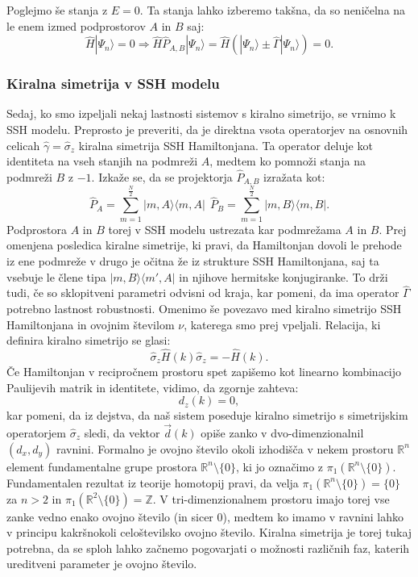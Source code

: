 Poglejmo še stanja z $E = 0$. Ta stanja lahko izberemo takšna, da so neničelna na le enem izmed podprostorov $A$ in $B$ saj:
\begin{equation}
\hat{H} | \Psi_n \rangle = 0  \Rightarrow  \hat{H} \hat{P}_{A,B} |\Psi_n \rangle = \hat{H} ( | \Psi_n \rangle \pm \hat{\Gamma} | \Psi_n \rangle ) = 0.
\end{equation}

\subsubsection{Kiralna simetrija v SSH modelu}
Sedaj, ko smo izpeljali nekaj lastnosti sistemov s kiralno simetrijo, se vrnimo k SSH modelu.
Preprosto je preveriti, da je direktna vsota operatorjev na osnovnih celicah $\hat{\gamma} = \hat{\sigma}_z$ kiralna simetrija SSH Hamiltonjana. Ta operator deluje kot identiteta na vseh stanjih na podmreži $A$, medtem ko pomnoži stanja na podmreži $B$ z $-1$.
Izkaže se, da se projektorja $\hat{P}_{A,B}$ izražata kot:
\begin{equation}
\hat{P}_A = \sum_{m=1}^{\frac{N}{2}}  | m, A \rangle \langle m, A | \ \ \hat{P}_B = \sum_{m=1}^{\frac{N}{2}}  | m, B \rangle \langle m, B |.
\end{equation}
Podprostora $A$ in $B$ torej v SSH modelu ustrezata kar podmrežama $A$ in $B$.
Prej omenjena posledica kiralne simetrije, ki pravi, da Hamiltonjan dovoli le prehode iz ene podmreže v drugo je očitna že iz strukture SSH Hamiltonjana, saj ta vsebuje le člene tipa $ |m, B \rangle \langle m' , A | $ in njihove hermitske konjugiranke. To drži tudi, če so sklopitveni parametri odvisni od kraja, kar pomeni, da ima operator $\hat{\Gamma}$ potrebno lastnost robustnosti.
Omenimo še povezavo med kiralno simetrijo SSH Hamiltonjana in ovojnim številom $\nu$, katerega smo prej vpeljali.
Relacija, ki definira kiralno simetrijo se glasi: 
\begin{equation}
\hat{\sigma}_z \hat{H}(k) \hat{\sigma}_z = - \hat{H}(k).
\end{equation}
Če Hamiltonjan v recipročnem prostoru spet zapišemo kot linearno kombinacijo Paulijevih matrik in identitete, vidimo, da zgornje zahteva:
\begin{equation}
d_z (k) = 0,
\end{equation}
kar pomeni, da iz dejstva, da naš sistem poseduje kiralno simetrijo s simetrijskim operatorjem $\hat{\sigma}_z$ sledi, da vektor $\vec{d}(k)$ opiše zanko v dvo-dimenzionalnil $(d_x,d_y)$ ravnini. Formalno je ovojno število okoli izhodišča v nekem prostoru $\mathbb{R}^n$ element fundamentalne grupe prostora $\mathbb{R}^n \setminus \{0\}$, ki jo označimo z $\pi_1 ( \mathbb{R}^n \setminus \{0 \})$. Fundamentalen rezultat iz teorije homotopij \cite{hatcher} pravi, da velja  $\pi_1 ( \mathbb{R}^n \setminus \{0 \}) = \{ 0 \}$ za $n>2$  in  $\pi_1 ( \mathbb{R}^2 \setminus \{0 \}) = \mathbb{Z}$.
V tri-dimenzionalnem prostoru imajo torej vse zanke vedno enako ovojno število (in sicer $0$), medtem ko imamo v ravnini lahko v principu kakršnokoli celoštevilsko ovojno število. Kiralna simetrija je torej tukaj potrebna, da se sploh lahko začnemo pogovarjati o možnosti različnih faz, katerih ureditveni parameter je ovojno število.

